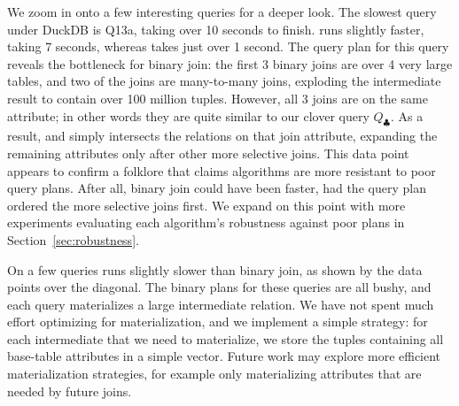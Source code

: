 We zoom in onto a few interesting queries for a deeper look.
The slowest query under DuckDB is Q13a, taking over 10 seconds to finish.
\GJ runs slightly faster, taking 7 seconds,
whereas \FJ takes just over 1 second.
The query plan for this query reveals the bottleneck for binary join:
the first 3 binary joins are over 4 very large tables,
and two of the joins are many-to-many joins, exploding the
intermediate result to contain over 100 million tuples.
However, all 3 joins are on the same attribute;
in other words they are quite  similar to our clover query $Q_\clubsuit$.
As a result, \GJ and \FJ simply intersects the relations
on that join attribute,
expanding the remaining attributes only after
other more selective joins.
This data point appears to confirm a folklore that claims
\WCOJ algorithms are more resistant to poor query plans.
After all, binary join could have been faster, had the query plan
ordered the more selective joins first.
We expand on this point with more experiments evaluating
each algorithm's robustness against poor plans in Section~\ref{sec:robustness}.

On a few queries \FJ runs slightly slower than binary join,
as shown by the data points over the diagonal.
The binary plans for these queries are all bushy,
and each query materializes a large intermediate relation.
We have not spent much effort optimizing for materialization,
and we implement a simple strategy: for each intermediate
that we need to materialize, we store the tuples containing
all base-table attributes in a simple vector.
Future work may explore more efficient materialization strategies,
for example only materializing attributes that
are needed by future joins.


